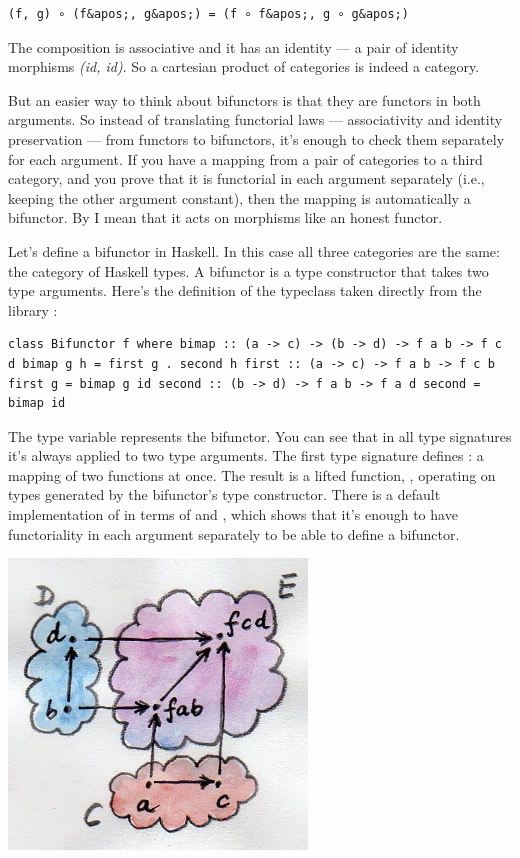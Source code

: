 \begin{verbatim}
(f, g) ∘ (f&apos;, g&apos;) = (f ∘ f&apos;, g ∘ g&apos;)
\end{verbatim}

The composition is associative and it has an identity --- a pair of
identity morphisms \emph{(id, id)}. So a cartesian product of categories
is indeed a category.

But an easier way to think about bifunctors is that they are functors in
both arguments. So instead of translating functorial laws ---
associativity and identity preservation --- from functors to bifunctors,
it's enough to check them separately for each argument. If you have a
mapping from a pair of categories to a third category, and you prove
that it is functorial in each argument separately (i.e., keeping the
other argument constant), then the mapping is automatically a bifunctor.
By  I mean that it acts on morphisms like an honest
functor.

Let's define a bifunctor in Haskell. In this case all three categories
are the same: the category of Haskell types. A bifunctor is a type
constructor that takes two type arguments. Here's the definition of the
 typeclass taken directly from the library
:

\begin{verbatim}
class Bifunctor f where bimap :: (a -> c) -> (b -> d) -> f a b -> f c d bimap g h = first g . second h first :: (a -> c) -> f a b -> f c b first g = bimap g id second :: (b -> d) -> f a b -> f a d second = bimap id
\end{verbatim}

The type variable  represents the bifunctor. You can see that
in all type signatures it's always applied to two type arguments. The
first type signature defines : a mapping of two functions
at once. The result is a lifted function,
, operating on types
generated by the bifunctor's type constructor. There is a default
implementation of  in terms of  and
, which shows that it's enough to have functoriality in
each argument separately to be able to define a bifunctor.

\hypertarget{attachment_4070}{}
\includegraphics[width=3.12500in]{images/bimap.jpg}

